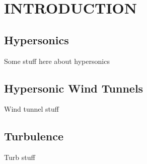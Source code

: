 %
%  
%



\pagestyle{plain} %
\setcounter{page}{1}


\chapter{INTRODUCTION}

\section{Hypersonics}

Some stuff here about hypersonics

\section{Hypersonic Wind Tunnels}

Wind tunnel stuff

\section{Turbulence}

Turb stuff


